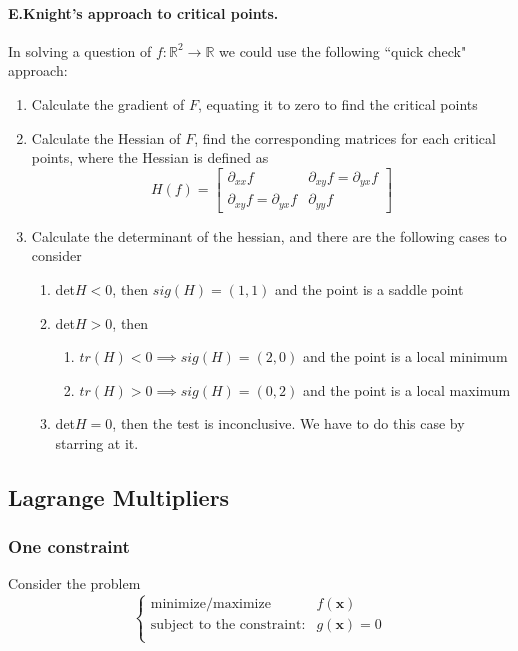 \documentclass[11pt]{article}
\newcommand{\tb}[1]{\textbf{#1}}
\newcommand{\real}[0]{\mathbb{R}}
\begin{document}
\paragraph{E.Knight's approach to critical points.}In solving a question of $f:\real^2 \rightarrow{} \real$ we could use the following ``quick check" approach:
\begin{enumerate}
    \item Calculate the gradient of $F$, equating it to zero to find the critical points
    \item Calculate the Hessian of $F$, find the corresponding matrices for each critical points, where the Hessian is defined as
    \begin{equation*} H(f) = 
        \begin{bmatrix}
             \partial_{xx}f & \partial_{xy}f = \partial_{yx}f \\
             \partial_{xy}f = \partial_{yx}f & \partial_{yy}f
        \end{bmatrix}
    \end{equation*}
    \item Calculate the determinant of the hessian, and there are the following cases to consider
    \begin{enumerate}
        \item det$H<0$, then $sig(H) = (1,1)$ and the point is a saddle point
        \item det$H>0$, then
            \begin{enumerate}
                \item $tr(H)<0 \implies sig(H) = (2,0)$ and the point is a local minimum
                \item $tr(H)>0 \implies sig(H) = (0,2)$ and the point is a local maximum
            \end{enumerate}
        \item det$H=0$, then the test is inconclusive. We have to do this case by starring at it.
    \end{enumerate}
\end{enumerate}
\subsection{Lagrange Multipliers}
\subsubsection{One constraint}
Consider the problem
\begin{equation*}
\begin{cases}
  \mbox{minimize/maximize} \quad &f(\tb{x}) \\
  \mbox{subject to the constraint:} &g(\tb{x}) = 0\\
\end{cases}
\end{equation*}
\end{document}
